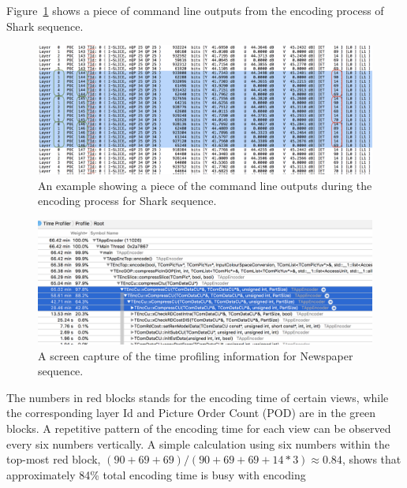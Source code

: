 Figure~\ref{fig:encoding-time-example} shows a piece of command line outputs
from the encoding process of Shark sequence.
\begin{figure}
    \centering
    \includegraphics[width=\textwidth,height=\textheight,keepaspectratio]{Figures/EncodingTimeEg}
    \caption[An example showing a piece of the command line outputs during
    the encoding process for Shark sequence]
    {An example showing a piece of the command line outputs during the
    encoding process for Shark sequence.
    }\label{fig:encoding-time-example}
\end{figure}
\begin{figure}[!b]
    \centering
    \includegraphics[width=\textwidth,height=\textheight,keepaspectratio]{Figures/major-time-spent-in-recursive-xcompresscu}
    \caption[A screen capture of the time profiling information for Newspaper sequence]
    {A screen capture of the time profiling information for Newspaper sequence.
    }\label{fig:major-time-spent-in-recursive-comresscu}
\end{figure}
The numbers in red blocks stands for the encoding time of certain views, while
the corresponding layer Id and Picture Order Count (POD) are in the green
blocks.
A repetitive pattern of the encoding time for each view can be observed
every six numbers vertically.
A simple calculation using six numbers within the top-most
red block, \((90+69+69)/(90+69+69+14*3) \approx 0.84\), shows that
approximately 84\% total encoding time is busy with encoding
